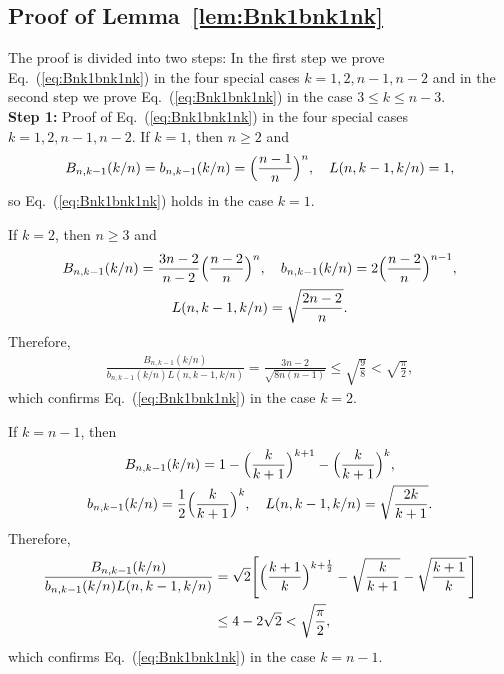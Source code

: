 \documentclass[aop]{imsart}
\theoremstyle{plain}
\theoremstyle{remark}
\newcommand{\1}{\operatorname{\uppercase\expandafter{\romannumeral1}}}
\newcommand{\2}{\operatorname{\uppercase\expandafter{\romannumeral2}}}
\newcommand{\3}{\operatorname{\uppercase\expandafter{\romannumeral3}}}
\newcommand{\4}{\operatorname{\uppercase\expandafter{\romannumeral4}}}
\newcommand{\5}{\operatorname{\uppercase\expandafter{\romannumeral5}}}
\newcommand{\6}{\operatorname{\uppercase\expandafter{\romannumeral6}}}
\newcommand{\7}{\operatorname{\uppercase\expandafter{\romannumeral7}}}
\newcommand{\8}{\operatorname{\uppercase\expandafter{\romannumeral8}}}
\newcommand{\9}{\operatorname{\uppercase\expandafter{\romannumeral9}}}
\newcommand{\eref}[1]{Eq.~\textup{(\ref{#1})}}
\newcommand{\lref}[1]{Lemma~\ref{#1}}
\begin{document}
\begin{appendix}
	


\subsection{Proof of \lref{lem:Bnk1bnk1nk}}
The proof is divided into two steps: In the first step  we prove   \eref{eq:Bnk1bnk1nk} in the four special cases $k=1,2,n-1,n-2$ and in the second step we prove   \eref{eq:Bnk1bnk1nk} in the case $3 \le k \le n-3$.\\



\textbf{Step 1:} Proof of \eref{eq:Bnk1bnk1nk} in the four special cases $k=1,2,n-1,n-2$. 
If $k=1$, then 	$n\geq 2$ and
	\begin{align}
	B_{n,k-1}(k/n)=b_{n,k-1}(k/n)=\Bigl(\frac{n-1}{n}\Bigr)^n,\quad L(n,k-1,k/n)=1,
	\end{align}
	so \eref{eq:Bnk1bnk1nk} holds in the case $k=1$. 
	
	If $k=2$, then $n\geq 3$ and
	\begin{gather}
	B_{n,k-1}(k/n)=\frac{3n-2}{n-2}\Bigl(\frac{n-2}{n}\Bigr)^n,\quad b_{n,k-1}(k/n)=2\Bigl(\frac{n-2}{n}\Bigr)^{n-1},\\
	 L(n,k-1,k/n)=\sqrt{\frac{2n-2}{n}}.
	\end{gather}
	Therefore,
	\begin{align}
	\frac{B_{n,k-1}(k/n)}{b_{n,k-1}(k/n)L(n,k-1,k/n)}=\frac{3n-2}{\sqrt{8n(n-1)}}
\leq \sqrt{\frac{9}{8}}<\sqrt{\frac{\pi}{2}}, 
	\end{align}
	which confirms \eref{eq:Bnk1bnk1nk} in the case $k=2$.
	
	If $k=n-1$, then 
	\begin{gather}
	B_{n,k-1}(k/n)=1-\Bigl(\frac{k}{k+1}\Bigr)^{k+1}-\Bigl(\frac{k}{k+1}\Bigr)^{k},\\ b_{n,k-1}(k/n)=\frac{1}{2}\Bigl(\frac{k}{k+1}\Bigr)^k,\quad
	L(n,k-1,k/n)=\sqrt{\frac{2k}{k+1}}.
	\end{gather}
	Therefore,
	\begin{align}
	\frac{B_{n,k-1}(k/n)}{b_{n,k-1}(k/n)L(n,k-1,k/n)}&=\sqrt{2}\Biggl[\Bigl(\frac{k+1}{k}\Bigr)^{k+\frac{1}{2}}-\sqrt{\frac{k}{k+1}}-\sqrt{\frac{k+1}{k}}\,\Biggr]\\
	&\leq 4-2\sqrt{2}< \sqrt{\frac{\pi}{2}}, \nonumber
	\end{align}	
	which confirms \eref{eq:Bnk1bnk1nk} in the case $k=n-1$.
	

\end{appendix}
\end{document}
